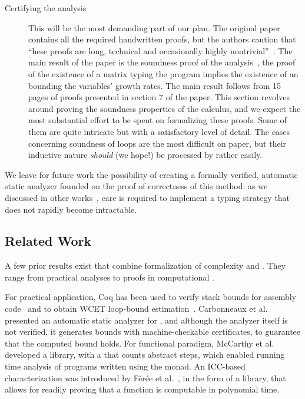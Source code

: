 \begin{description}
\item[Certifying the analysis]
This will be the most demanding part of our plan. The original paper contains
all the required handwritten proofs, but the authors caution that
\enquote{hese proofs are long, technical and occasionally highly
nontrivial}~\cite[p.~2]{jones2009}. The main result of the paper is the
soundness proof of the analysis~\cite[Theorem 5.3]{jones2009}, \ie the proof of the existence of a matrix
typing the program implies the existence of an  bounding
the variables' growth rates. The main result follows from 15 pages of proofs
presented in section 7 of the paper. This section revolves around proving the
soundness properties of the calculus, and we expect the most
substantial effort to be spent on formalizing these proofs. Some of them are
quite intricate but with a satisfactory level of detail. The cases concerning
soundness of loops are the most difficult on paper, but their inductive nature
\emph{should} (we hope!) be processed by  rather easily.

\end{description}

We leave for future work the possibility of creating a formally verified,
automatic static analyzer founded on the proof of correctness of this method: as
we discussed in other works~\cite{aubert2023b,aubert20222}, care is required to
implement a typing strategy that does not rapidly become intractable.

\subsection{Related Work}
\label{subsec:coqpl-related}

A few prior results exist that combine formalization of complexity and
. They range from practical analyses to proofs in computational
.

For practical application, Coq has been used to verify stack bounds for assembly
code~\cite{carbonneaux2014} and to obtain WCET
loop-bound estimation~\cite{blazy2013}. {Carbonneaux et
al.}~\cite{carbonneaux2017} presented an automatic static analyzer for
, and although the analyzer itself is not verified, it
generates bounds with machine-checkable certificates, to guarantee that the
computed bound holds. For functional paradigm, McCarthy et
al.~\cite{mccarthy2018} developed a  library, with a  that
counts abstract steps, which enabled running time analysis of programs written
using the monad. An ICC-based characterization was introduced by Férée et
al.~\cite{feree2018}, in the form of a  library, that allows for
readily proving that a function is computable in polynomial time.

